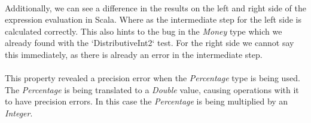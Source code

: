 \\
Additionally, we can see a difference in the results on the left and right side of the expression evaluation in Scala. Where as the intermediate step for the left side is calculated correctly. This also hints to the bug in the \textit{Money} type which we already found with the `DistributiveInt2` test. For the right side we cannot say this immediately, as there is already an error in the intermediate step.\\
\\
This property revealed a precision error when the \textit{Percentage} type is being used. The \textit{Percentage} is being translated to a \textit{Double} value, causing operations with it to have precision errors. In this case the \textit{Percentage} is being multiplied by an \textit{Integer}.

